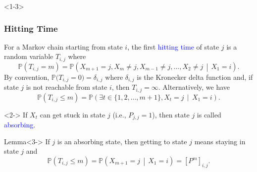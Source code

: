 \documentclass[10pt,english,aspectratio=169]{beamer}
\renewcommand{\Pr}{\mathbb{P}}
\begin{document}
\begin{frame}<1-3> \frametitle{Hitting Time}

\begin{definition}For a Markov chain starting from state $i$, the first \textcolor{blue}{hitting time} of state $j$ is a random variable $T_{i,j}$ where \vspace{-2mm}
\[
\Pr\left(T_{i,j}=m\right)=\Pr\left(X_{m+1}=j,X_{m}\neq j,X_{m-1}\neq j,\ldots,X_{2}\neq j\,\middle|\,X_{1}=i\right).
\]
By convention, $\Pr\big(T_{i,j}\!=\!0\big)\!=\!\delta_{i,j}$ where $\delta_{i,j}$ is the Kronecker delta function and,  if state $j$ is not reachable from state $i$, then $T_{i,j} = \infty$.
Alternatively, we have
\vspace{-2mm}
\[
\Pr\left(T_{i,j} \leq m\right)=\Pr\left(\exists t \in \{1,2,\ldots,m+1\}, X_{t}=j \,\middle|\,X_{1}=i\right).
\]
\end{definition}

\vspace{1mm}


\begin{definition}<2->
If $X_t$ can get stuck in state $j$ (i.e., $P_{j,j} = 1$), then state $j$ is called \textcolor{blue}{absorbing}.
\end{definition}


\begin{exampleblock}{Lemma}<3->
If $j$ is an absorbing state, then getting to state $j$ means staying in state $j$ and \vspace{-1.75mm}
\[
\Pr\left(T_{i,j} \leq m\right)= \Pr\left(X_{m+1} = j \,\middle|\,X_{1}=i\right)=\left[P^{m}\right]_{i,j}.
\]
\end{exampleblock}



\end{frame}
\end{document}
